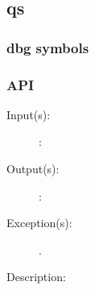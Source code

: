 %
%
%
%
%              

\label{qs}
\subsection{qs}

\subsubsection{dbg symbols}

\subsubsection{API}
\begin{description}
\label{qs_}
\item[{\cfunc[]{qs\_}{}}: ]
	\begin{description}\item[]
	\item[Input(s): ]
		\begin{description}\item[]
		\item[: ]
		\end{description}
	\item[Output(s): ]
		\begin{description}\item[]
		\item[: ]
		\end{description}
	\item[Exception(s): ]
		\begin{description}\item[]
		\item[.]
		\end{description}
	\item[Description: ]
	\end{description}
\end{description}
